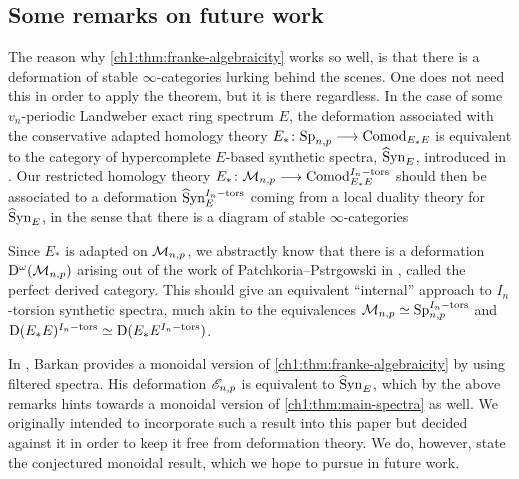 



\subsection*{Some remarks on future work}

The reason why \cref{ch1:thm:franke-algebraicity} works so well, is that there is a deformation of stable $\infty$-categories lurking behind the scenes. One does not need this in order to apply the theorem, but it is there regardless. In the case of some $v_n$-periodic Landweber exact ring spectrum $E$, the deformation associated with the conservative adapted homology theory $E_*\colon \mathrm{Sp}_{n,p} \longrightarrow \mathrm{Comod}_{E_*E}$ is equivalent to the category of hypercomplete $E$-based synthetic spectra, $\widehat{\mathrm{S}}\mathrm{yn}_{E}$, introduced in \cite{pstragowski_2022}. Our restricted homology theory $E_*\colon \mathcal{M}_{n,p}\longrightarrow \mathrm{Comod}_{E_*E}^{I_n-\mathrm{tors}}$ should then be associated to a deformation $\widehat{\mathrm{S}}\mathrm{yn}_{E}^{I_n-\mathrm{tors}}$ coming from a local duality theory for $\widehat{\mathrm{S}}\mathrm{yn}_{E}$, in the sense that there is a diagram of stable $\infty$-categories 
\begin{center}
\end{center}
Since $E_*$ is adapted on $\mathcal{M}_{n,p}$, we abstractly know that there is a deformation $\mathrm{D}^\omega(\mathcal{M}_{n,p})$ arising out of the work of Patchkoria--Pstr\a{}gowski in \cite{patchkoria-pstragowski_2021}, called the perfect derived category. This should give an equivalent ``internal'' approach to $I_n$-torsion synthetic spectra, much akin to the equivalences $\mathcal{M}_{n,p}\simeq \mathrm{Sp}_{n,p}^{I_n-\mathrm{tors}}$ and $\mathrm{D}(E_*E)^{I_n-\mathrm{tors}}\simeq \mathrm{D}(E_*E^{I_n-\mathrm{tors}})$. 

In \cite{barkan_2023}, Barkan provides a monoidal version of \cref{ch1:thm:franke-algebraicity} by using filtered spectra. His deformation $\mathscr{E}_{n,p}$ is equivalent to $\widehat{\mathrm{S}}\mathrm{yn}_{E}$, which by the above remarks hints towards a monoidal version of \cref{ch1:thm:main-spectra} as well. We originally intended to incorporate such a result into this paper but decided against it in order to keep it free from deformation theory. We do, however, state the conjectured monoidal result, which we hope to pursue in future work.

